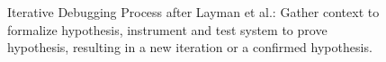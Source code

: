 \begin{figure}
  \caption{Iterative Debugging Process after Layman et al.: Gather context to formalize hypothesis, instrument and test system to prove hypothesis, resulting in a new iteration or a confirmed hypothesis.}
  \label{fig:debugging-process}
\end{figure}
